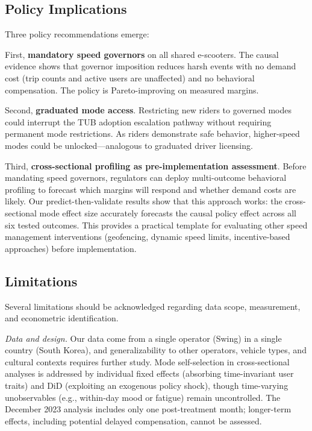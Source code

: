 \subsection{Policy Implications}
\label{sec:disc_policy}

Three policy recommendations emerge:

First, \textbf{mandatory speed governors} on all shared e-scooters. The causal evidence shows that governor imposition reduces harsh events with no demand cost (trip counts and active users are unaffected) and no behavioral compensation. The policy is Pareto-improving on measured margins.

Second, \textbf{graduated mode access}. Restricting new riders to governed modes could interrupt the TUB adoption escalation pathway without requiring permanent mode restrictions. As riders demonstrate safe behavior, higher-speed modes could be unlocked---analogous to graduated driver licensing.

Third, \textbf{cross-sectional profiling as pre-implementation assessment}. Before mandating speed governors, regulators can deploy multi-outcome behavioral profiling to forecast which margins will respond and whether demand costs are likely. Our predict-then-validate results show that this approach works: the cross-sectional mode effect size accurately forecasts the causal policy effect across all six tested outcomes. This provides a practical template for evaluating other speed management interventions (geofencing, dynamic speed limits, incentive-based approaches) before implementation.

\subsection{Limitations}
\label{sec:disc_limitations}

Several limitations should be acknowledged regarding data scope, measurement, and econometric identification.

\textit{Data and design.} Our data come from a single operator (Swing) in a single country (South Korea), and generalizability to other operators, vehicle types, and cultural contexts requires further study. Mode self-selection in cross-sectional analyses is addressed by individual fixed effects (absorbing time-invariant user traits) and DiD (exploiting an exogenous policy shock), though time-varying unobservables (e.g., within-day mood or fatigue) remain uncontrolled. The December 2023 analysis includes only one post-treatment month; longer-term effects, including potential delayed compensation, cannot be assessed.

